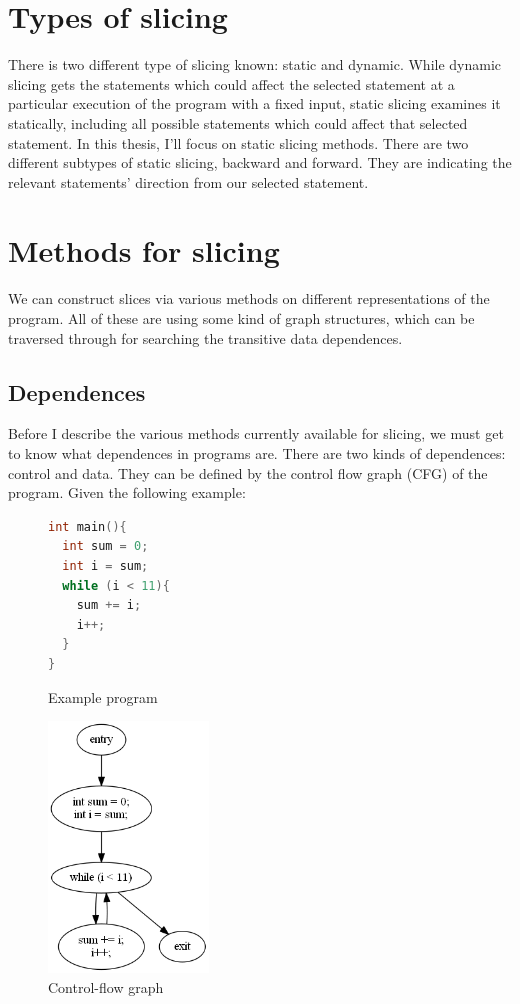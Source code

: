 \documentclass[oneside,12pt,a4paper]{book}
\begin{document}
\section{Types of slicing}
There is two different type of slicing known: static and dynamic. While dynamic slicing gets the statements which could affect the selected statement at a particular execution of the program with a fixed input, static slicing examines it statically, including all possible statements which could affect that selected statement. In this thesis, I'll focus on static slicing methods. There are two different subtypes of static slicing, backward and forward. They are indicating the relevant statements' direction from our selected statement. 

\section{Methods for slicing}
We can construct slices via various methods on different representations of the program. All of these are using some kind of graph structures, which can be traversed through for searching the transitive data dependences.

\subsection{Dependences}
Before I describe the various methods currently available for slicing, we must get to know what dependences in programs are. There are two kinds of dependences: control and data. They can be defined by the control flow graph (CFG) of the program. Given the following example:
\begin{figure}[h]
\begin{lstlisting}[language=C++]
int main(){
  int sum = 0;
  int i = sum;
  while (i < 11){
    sum += i;
    i++;
  }
}
\end{lstlisting}
\caption{Example program}
\label{fig:example_prog}
\end{figure}

\begin{figure}
  \centering
    \includegraphics[width=0.38\textwidth]{horwitz_cfg.png}
  \caption{Control-flow graph}
  \label{fig:horwitz_cfg}
\end{figure}
\end{document}
